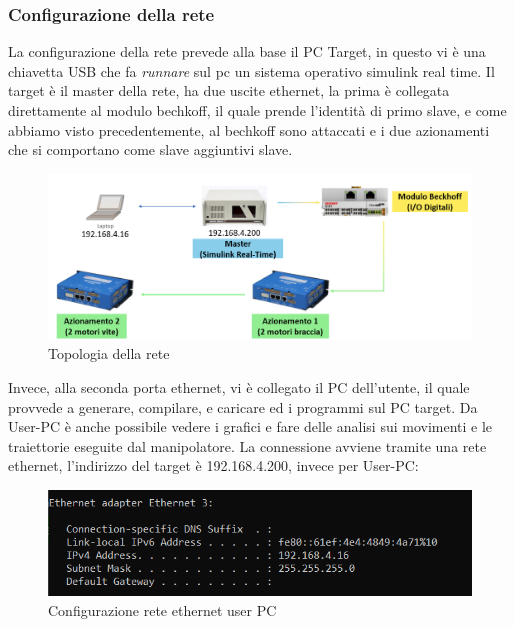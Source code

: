 \subsubsection{Configurazione della rete}
La configurazione della rete prevede alla base il PC Target, in questo vi è una chiavetta USB che fa \textit{runnare} sul pc un sistema operativo simulink real time. Il target è il master della rete, ha due uscite ethernet, la prima è collegata direttamente al modulo bechkoff, il quale prende l'identità di primo slave, e come abbiamo visto precedentemente, al bechkoff sono attaccati e i due azionamenti che si comportano come slave aggiuntivi slave.
\begin{figure}[ht]
\begin{center}
    \includegraphics[scale=0.5]{Immagini/Sperimentale/Topology.PNG}
    \caption{Topologia della rete}
    \label{fig:NetTopology1}
\end{center}
\end{figure}
Invece, alla seconda porta ethernet, vi è collegato il PC dell'utente, il quale provvede a generare, compilare, e caricare ed  i programmi sul PC target. Da User-PC è anche possibile vedere i grafici e fare delle analisi sui movimenti e le traiettorie eseguite dal manipolatore. La connessione avviene tramite una rete ethernet, l'indirizzo del target è 192.168.4.200, invece per User-PC:
\begin{figure}[ht]
\begin{center}
    \includegraphics[scale=0.7]{Immagini/Sperimentale/ConfEthernet.png}
    \caption{Configurazione rete ethernet user PC}
    \label{fig:ConfEthernet}
\end{center}
\end{figure}
